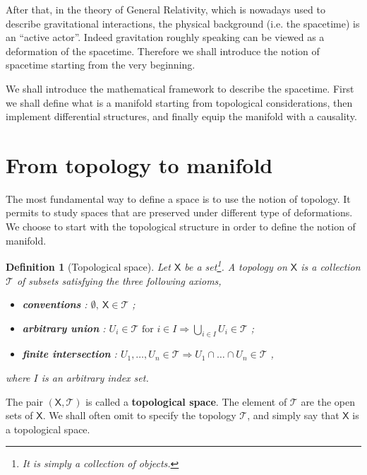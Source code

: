 \documentclass[11pt]{book}
\newcommand{\Tcal}{\mathcal{T}}
\newcommand{\Xsf}{\mathsf{X}}
\theoremstyle{break}
\newtheorem{definition}{Definition}[chapter]
\begin{document}
After that, in the theory of General Relativity, which is nowadays used to describe gravitational interactions, the physical background (i.e. the spacetime) is an ``active actor''. Indeed gravitation roughly speaking can be viewed as a deformation of the spacetime. Therefore we shall introduce the notion of spacetime starting from the very beginning.


We shall introduce the mathematical framework to describe the spacetime. First we shall define what is a manifold starting from topological considerations, then implement differential structures, and finally equip the manifold with a causality.


\section{From topology to manifold}
\label{p:TOPO_M}


The most fundamental way to define a space is to use the notion of topology. It permits to study spaces that are preserved under different type of deformations. We choose to start with the topological structure in order to define the notion of manifold.


\begin{definition}[Topological space] 
Let $\Xsf$ be a set\footnote{It is simply a collection of objects.}. A topology on $\Xsf$ is a collection $\Tcal$ of subsets satisfying the three following axioms,%
%
\begin{itemize}
\item \textbf{conventions} : $\emptyset , \ \Xsf \in \Tcal$ ;
\item \textbf{arbitrary union} : $U_i \in \Tcal \mbox{ for } i \in I \Longrightarrow \bigcup_{i\in I} U_i \in \Tcal$ ;
\item \textbf{finite intersection} : $U_1 , \dots , U_n \in \Tcal \Longrightarrow U_1 \cap \dots \cap U_n \in \Tcal$ ,
\end{itemize}
%
where $I$ is an arbitrary index set.
\end{definition}
%
The pair $(\Xsf,\Tcal)$ is called a \textbf{topological space}. The element of $\Tcal$ are the open sets of $\Xsf$. We shall often omit to specify the topology $\Tcal$, and simply say that $\Xsf$ is a topological space. 


\bigskip
\end{document}
